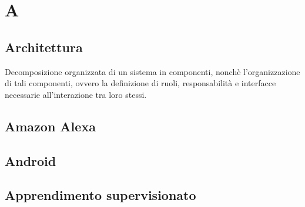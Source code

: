 \section*{A}

\subsection{Architettura}
Decomposizione organizzata di un sistema in componenti, nonchè l'organizzazione di tali componenti, ovvero la definizione di ruoli, responsabilità e interfacce necessarie all'interazione tra loro stessi.

\subsection{Amazon Alexa}

\subsection{Android}

\subsection{Apprendimento supervisionato}